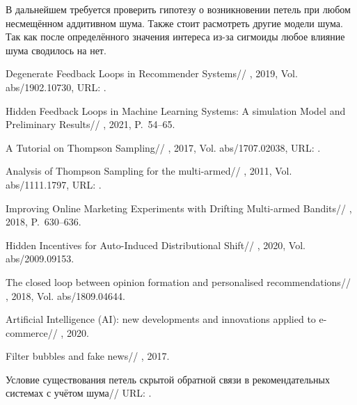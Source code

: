 \documentclass[12pt, twoside]{article}
\begin{document}
В дальнейшем требуется проверить гипотезу о возникновении петель при любом несмещённом аддитивном шума. 
Также стоит расмотреть другие модели шума. 
Так как после определённого значения интереса из-за сигмоиды любое влияние шума сводилось на нет. 
\begin{thebibliography}{99}
    Degenerate Feedback Loops in Recommender Systems//
    , 2019, Vol. abs/1902.10730,
	  URL: .

    Hidden Feedback Loops in Machine Learning Systems: A simulation Model and Preliminary Results//
    , 2021, P.~54--65.

    A Tutorial on Thompson Sampling//
    , 2017, Vol. abs/1707.02038,
	  URL: .

    Analysis of Thompson Sampling for the multi-armed//
    , 2011, Vol. abs/1111.1797,
	  URL: .

    Improving Online Marketing Experiments with Drifting Multi-armed Bandits//
    , 2018, P.~630--636.

    Hidden Incentives for Auto-Induced Distributional Shift//
    , 2020, Vol. abs/2009.09153.

    The closed loop between opinion formation and personalised recommendations//
    , 2018, Vol. abs/1809.04644.

    Artificial Intelligence (AI): new developments and innovations applied to e-commerce//
    , 2020.

    Filter bubbles and fake news//
    , 2017.

    Условие существования петель скрытой обратной связи в рекомендательных системах с учётом шума//
	  URL: .
\end{thebibliography}
\end{document}
